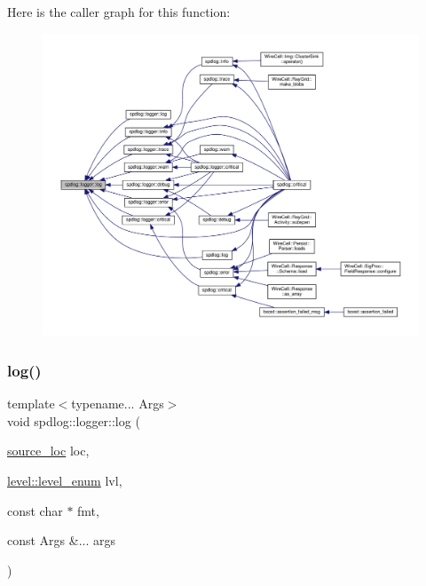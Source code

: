 Here is the caller graph for this function\+:
\nopagebreak
\begin{figure}[H]
\begin{center}
\leavevmode
\includegraphics[width=350pt]{classspdlog_1_1logger_a1e4b2c515490efb5456665a9a64382d9_icgraph}
\end{center}
\end{figure}
\mbox{\label{classspdlog_1_1logger_a50417cea5f81704cd4800aaafa944bc5}} 
\subsubsection{\texorpdfstring{log()}{log()}\hspace{0.1cm}{\footnotesize\ttfamily [2/8]}}
{\footnotesize\ttfamily template$<$typename... Args$>$ \\
void spdlog\+::logger\+::log (\begin{DoxyParamCaption}\item[{\hyperlink{structspdlog_1_1source__loc}{source\+\_\+loc}}]{loc,  }\item[{\hyperlink{namespacespdlog_1_1level_a35f5227e5daf228d28a207b7b2aefc8b}{level\+::level\+\_\+enum}}]{lvl,  }\item[{const char $\ast$}]{fmt,  }\item[{const Args \&...}]{args }\end{DoxyParamCaption})\hspace{0.3cm}{\ttfamily [inline]}}



